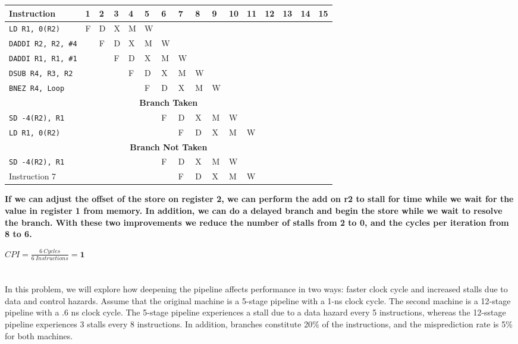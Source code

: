 \documentclass{article}
\begin{document}
\begin{adjustwidth}{2.5em}{0pt}
\vspace{5mm}
\begin{tabular}{|p{3cm}|p{.2cm}|p{.2cm}|p{.2cm}|p{.2cm}|p{.2cm}|p{.2cm}|p{.2cm}|p{.2cm}|p{.2cm}|p{.2cm}|p{.2cm}|p{.2cm}|p{.2cm}|p{.2cm}|p{.2cm}|}
\hline
\textbf{Instruction} & \textbf{1} & \textbf{2} & \textbf{3} & \textbf{4} & \textbf{5} & \textbf{6} & \textbf{7} & \textbf{8} & \textbf{9} & \textbf{10} & \textbf{11} & \textbf{12} & \textbf{13} & \textbf{14} & \textbf{15}\\
\hline
\texttt{LD R1, 0(R2)} & F & D & X & M & W & & & & & & & & & &   \\
\texttt{DADDI R2, R2, \#4} & & F& D& X& M& W& & & & & & & & & \\
\texttt{DADDI R1, R1, \#1}& & & F & D & X & M& W& & & & & & & &  \\
\texttt{DSUB R4, R3, R2} & & & & F & D& X& M& W& & & & & & &\\
\texttt{BNEZ R4, Loop} & & & & & F& D& X& M& W& & & & & &\\

\hline
\multicolumn{16}{|c|}{\textbf{Branch Taken}}\\
\hline
\texttt{SD -4(R2), R1} & & & & &  & F&  D& X& M& W& & & & &  \\
\texttt{LD R1, 0(R2)} & & & & & & & F& D& X& M& W& & & &\\
\hline
\multicolumn{16}{|c|}{\textbf{Branch Not Taken}}\\
\hline
\texttt{SD -4(R2), R1} & & & & &  & F&  D& X& M& W& & & & &  \\
Instruction 7 & & & & & & & F & D& X& M& W& & & & \\
\hline
\end{tabular}

\vspace{5mm}
\textbf{If we can adjust the offset of the store on register 2, we can perform the add on r2 to stall for time while we wait for the value in register 1 from memory. In addition, we can do a delayed branch and begin the store while we wait to resolve the branch. With these two improvements we reduce the number of stalls from 2 to 0, and the cycles per iteration from 8 to 6.}

$CPI=\frac{6\ Cycles}{6\ Instructions}=\textbf{1}$

\end{adjustwidth}
 
\section{}
In this problem, we will explore how deepening the pipeline affects performance in two ways: faster clock cycle and increased stalls due to data and control hazards. Assume that the original machine is a 5-stage pipeline with a 1-ns clock cycle. The second machine is a 12-stage pipeline with a .6 ns clock cycle. The 5-stage pipeline experiences a stall due to a data hazard every 5 instructions, whereas the 12-sstage pipeline experiences 3 stalls every 8 instructions. In addition, branches constitute 20\% of the instructions, and the misprediction rate is 5\% for both machines.
\end{document}
